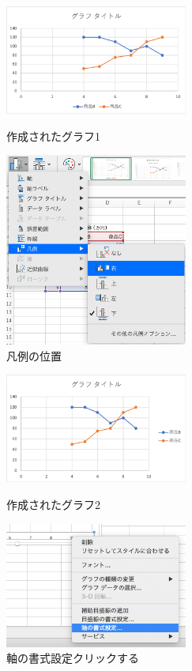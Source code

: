 \begin{figure}[tb]
    \begin{minipage}{0.5\hsize}
        \centering
        \includegraphics[width=6cm]{chap2/line1.png}
        \caption{作成されたグラフ1}
        \label{fig:line1}
    \end{minipage}
    \begin{minipage}{0.5\hsize}
        \centering
        \includegraphics[width=6cm]{chap2/line_hanrei.png}
        \caption{凡例の位置}
        \label{fig:line_hanrei}
    \end{minipage}
\end{figure}

\begin{figure}[tb]
    \begin{minipage}{0.5\hsize}
        \centering
        \includegraphics[width=6cm]{chap2/line2.png}
        \caption{作成されたグラフ2}
        \label{fig:line2}
    \end{minipage}
    \begin{minipage}{0.5\hsize}
        \centering
        \includegraphics[width=6cm]{chap2/line_axis.png}
        \caption{軸の書式設定クリックする}
        \label{fig:line_axis}
    \end{minipage}
\end{figure}

